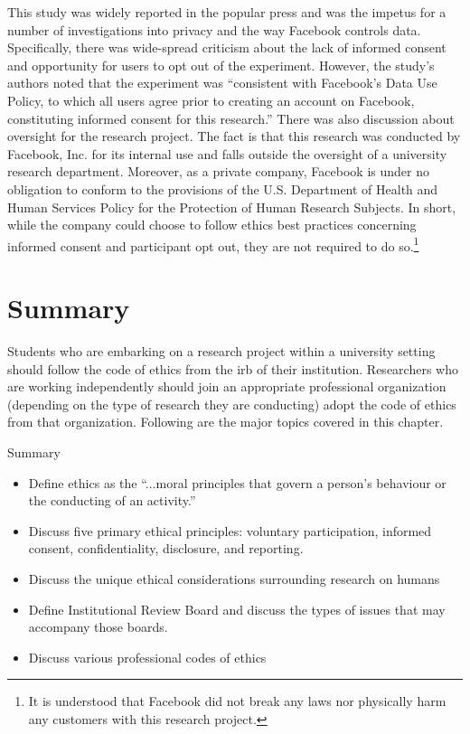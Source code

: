 This study was widely reported in the popular press and was the impetus for a number of investigations into privacy and the way Facebook controls data. Specifically, there was wide-spread criticism about the lack of informed consent and opportunity for users to opt out of the experiment. However, the study's authors noted that the experiment was ``consistent with Facebook's Data Use Policy, to which all users agree prior to creating an account on Facebook, constituting informed consent for this research.'' There was also discussion about oversight for the research project. The fact is that this research was conducted by Facebook, Inc. for its internal use and falls outside the oversight of a university research department. Moreover, as a private company, Facebook is under no obligation to conform to the provisions of the U.S. Department of Health and Human Services Policy for the Protection of Human Research Subjects. In short, while the company could choose to follow ethics best practices concerning informed consent and participant opt out, they are not required to do so.\footnote{It is understood that Facebook did not break any laws nor physically harm any customers with this research project.}

\section{Summary}

Students who are embarking on a research project within a university setting should follow  the code of ethics from the \gls{irb} of their institution. Researchers who are working independently should join an appropriate professional organization (depending on the type of research they are conducting) adopt the code of ethics from that organization. Following are the major topics covered in this chapter.

\begin{center}
	\begin{tkawybox}{Summary}
		\begin{itemize}
			\setlength{\itemsep}{0pt}
			\setlength{\parskip}{0pt}
			\setlength{\parsep}{0pt}
			
			\item Define ethics as the ``...moral principles that govern a person's behaviour or the conducting of an activity.''
			\item Discuss five primary ethical principles: voluntary participation, informed consent, confidentiality, disclosure, and reporting.
			\item Discuss the unique ethical considerations surrounding research on humans
			\item Define Institutional Review Board and discuss the types of issues that may accompany those boards.
			\item Discuss various professional codes of ethics
		\end{itemize}
	\end{tkawybox}
\end{center}


